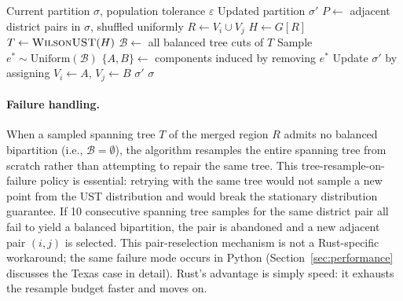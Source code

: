 \begin{algorithm}
\caption{One ReCom Step}
\label{alg:recom}
\begin{algorithmic}[1]
\Require Current partition $\sigma$, population tolerance $\varepsilon$
\Ensure Updated partition $\sigma'$
\State $P \leftarrow$ adjacent district pairs in $\sigma$, shuffled uniformly
  \State $R \leftarrow V_i \cup V_j$ 
  \State $H \leftarrow G[R]$ 
    \State $T \leftarrow \textsc{WilsonUST}(H)$ 
    \State $\mathcal{B} \leftarrow$ all balanced tree cuts of $T$
      \State Sample $e^* \sim \mathrm{Uniform}(\mathcal{B})$
      \State $\{A, B\} \leftarrow$ components induced by removing $e^*$
      \State Update $\sigma'$ by assigning $V_i \leftarrow A$, $V_j \leftarrow B$
      \State \Return $\sigma'$
    \EndIf
  \EndFor
\EndFor
\State \Return $\sigma$ 
\end{algorithmic}
\end{algorithm}

\paragraph{Failure handling.}
When a sampled spanning tree $T$ of the merged region $R$ admits no
balanced bipartition (i.e., $\mathcal{B} = \emptyset$), the algorithm
resamples the entire spanning tree from scratch rather than attempting to
repair the same tree.
This tree-resample-on-failure policy is essential: retrying with the
same tree would not sample a new point from the UST distribution and
would break the stationary distribution guarantee.
If 10 consecutive spanning tree samples for the same district pair all
fail to yield a balanced bipartition, the pair is abandoned and a new
adjacent pair $(i,j)$ is selected.
This pair-reselection mechanism is not a Rust-specific workaround; the
same failure mode occurs in Python \gc{} (Section~\ref{sec:performance}
discusses the Texas case in detail).
Rust's advantage is simply speed: it exhausts the resample budget faster
and moves on.

